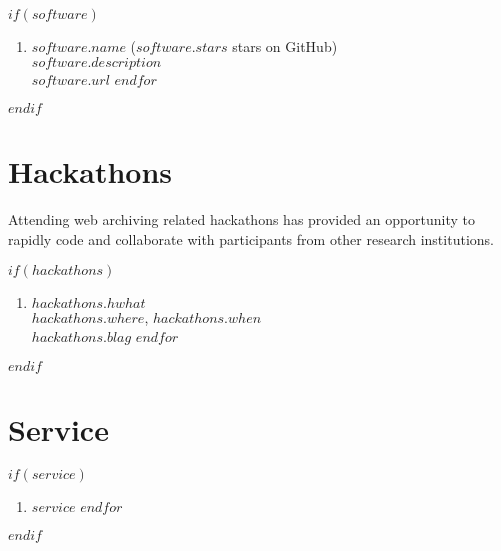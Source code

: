 \documentclass[$fontsize$, a4paper]{article}
\begin{document}
$if(software)$
\begin{enumerate}
$for(software)$
\item \textit{$software.name$}  ($software.stars$ stars on GitHub)\\$software.description$\\$software.url$
$endfor$
\end{enumerate}
$endif$

\section*{Hackathons}
Attending web archiving related hackathons has provided an opportunity to rapidly code and collaborate with participants from other research institutions.

$if(hackathons)$
\begin{enumerate}
$for(hackathons)$
\item $hackathons.hwhat$\\$hackathons.where$, $hackathons.when$\\$hackathons.blag$
$endfor$
\end{enumerate}
$endif$

\section*{Service}
$if(service)$
\begin{enumerate}
$for(service)$
\item $service$
$endfor$
\end{enumerate}
$endif$
\end{document}
